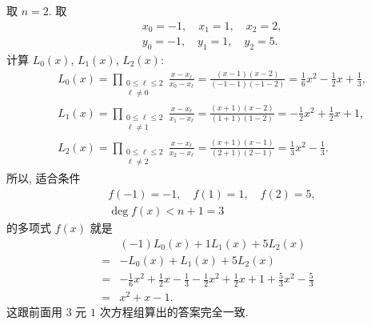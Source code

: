 \begin{example}
    取 $n = 2$. 取
    \begin{align*}
         & x_0 = -1, \quad x_1 = 1, \quad x_2 = 2, \\
         & y_0 = -1, \quad y_1 = 1, \quad y_2 = 5.
    \end{align*}
    计算 $L_0 (x)$, $L_1 (x)$, $L_2 (x)$:
    \begin{align*}
         & L_0 (x) = \prod_{\begin{smallmatrix}0 \leq \ell \leq 2 \\\ell \neq 0\end{smallmatrix}} \frac{x - x_\ell}{x_0 - x_\ell} = \frac{(x - 1)(x - 2)}{(-1 - 1)(-1 - 2)} = \frac16 x^2 - \frac12 x + \frac13, \\
         & L_1 (x) = \prod_{\begin{smallmatrix}0 \leq \ell \leq 2 \\\ell \neq 1\end{smallmatrix}} \frac{x - x_\ell}{x_1 - x_\ell} = \frac{(x + 1)(x - 2)}{(1 + 1)(1 - 2)} = -\frac12 x^2 + \frac12 x + 1,        \\
         & L_2 (x) = \prod_{\begin{smallmatrix}0 \leq \ell \leq 2 \\\ell \neq 2\end{smallmatrix}} \frac{x - x_\ell}{x_2 - x_\ell} = \frac{(x + 1)(x - 1)}{(2 + 1)(2 - 1)} = \frac13 x^2 - \frac13.
    \end{align*}
    所以, 适合条件
    \begin{align*}
         & f(-1) = -1, \quad f(1) = 1, \quad f(2) = 5, \\
         & \deg f(x) < n + 1 = 3
    \end{align*}
    的多项式 $f(x)$ 就是
    \begin{align*}
             & (-1)L_0 (x) + 1L_1 (x) + 5L_2 (x)  \\
        = {} & -L_0 (x) + L_1 (x) + 5L_2 (x)      \\
        = {} & -\frac16 x^2 + \frac12 x - \frac13
        - \frac12 x^2 + \frac12 x + 1
        + \frac53 x^2 - \frac53                   \\
        = {} & x^2 + x - 1.
    \end{align*}
    这跟前面用 $3$ 元 $1$ 次方程组算出的答案完全一致.
\end{example}

